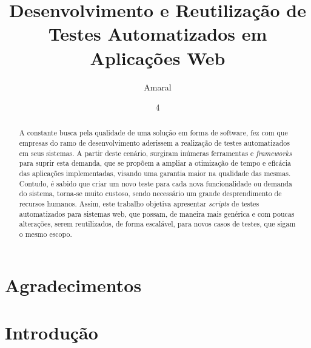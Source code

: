 \documentclass[tg]{mdtufsm}
\title{Desenvolvimento e Reutilização de Testes Automatizados em Aplicações Web}
\author{Amaral}{Lucas Antunes}
\institute{Centro de Tecnologia}
\date{4}{Dezembro}{2015}
\begin{document}
\maketitle
%

\chapter*{Agradecimentos}
\begin{abstract}
A constante busca pela qualidade de uma solução em forma de software, fez com que empresas do ramo de desenvolvimento aderissem a realização de testes automatizados em seus sistemas. A partir deste cenário,
surgiram inúmeras ferramentas e \emph{frameworks} para suprir esta demanda, que se propõem  a ampliar a otimização de tempo e
eficácia das aplicações implementadas, visando uma garantia maior na qualidade das mesmas. Contudo, é sabido que criar
um novo teste para cada nova funcionalidade ou demanda do sistema, torna-se muito custoso, sendo necessário um grande
desprendimento de recursos humanos. Assim, este trabalho objetiva apresentar \emph{scripts} de testes automatizados para
sistemas web, que possam, de maneira mais genérica e com poucas alterações, serem reutilizados, de forma escalável,
para novos casos de testes, que sigam o mesmo escopo.
\end{abstract}


\tableofcontents
\listoffigures
\listoftables

\setlength{\baselineskip}{1.5\baselineskip}


\chapter{Introdução}
\end{document}
